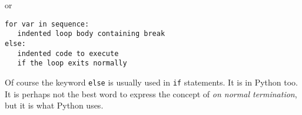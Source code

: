 or

\begin{verbatim}
for var in sequence:
   indented loop body containing break
else:
   indented code to execute
   if the loop exits normally
\end{verbatim}


Of course the keyword \texttt{else} is usually used in \texttt{if} statements. It is in Python too. It is
perhaps not the best word to express the concept of \emph{on normal termination}, but it is what Python uses.

\endinput


\subsection[ \texttt{if}
\texttt{Statements}]{}
\texttt{if} \texttt{Statements}}{ if Statements}}\label{if-statements}

\paragraph[ \texttt{if
else}]{} \texttt{if
else}}{ if else}}\label{if-else}

 statement will execute
code based on whether an expression is true. The form of an \texttt{if}
statement is

if expr:

 indented code to be executed if
expr is true

If you want to execute other code
if the expression is false, use the \texttt{else} clause:

if expr:

 indented code to be executed if
expr is true

else:

 indented code to be executed if
expr is false

\paragraph[
\texttt{elif}]{}
\texttt{elif}}{ elif}}\label{elif}

Of course, you often want to test a
sequence of conditions and execute code for the first one that's true.
Because of indentation, it would be annoying if you had to put another
\texttt{if} within the \texttt{else} and indent further. Python avoids this
problem with the \texttt{elif} clause, equaling an \texttt{else} plus an
\texttt{if}. The general syntax of an \texttt{if} statement is:

